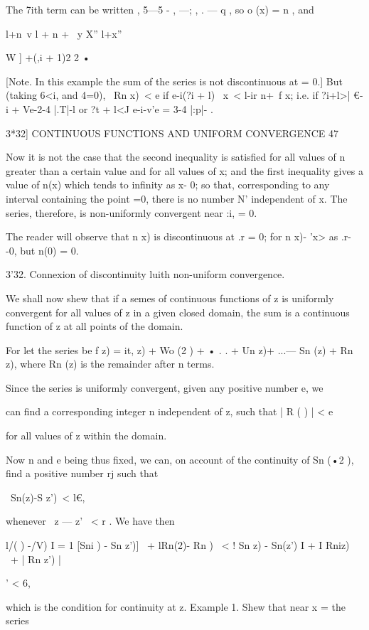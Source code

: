 The 7ith term can be written , 5—5 - , —; , . — q , so o (x) = n ,
and

l+n\ v l + n + \ y X'' l+x''

  W ] +(,i + 1)2 2 •

[Note. In this example the sum of the series is not discontinuous at =
0.] But (taking 6<i, and 4=0), \ Rn x)\ < e if e-i(?i + l) \ x\ < l-ir
n+\ f x; i.e. if ?i+l>| €-i + Ve-2-4 |.T|-l or ?t + l<J e-i-v'e = 3-4
|:p|- .



3*32] CONTINUOUS FUNCTIONS AND UNIFORM CONVERGENCE 47

Now it is not the case that the second inequality is satisfied for all
values of n greater than a certain value and for all values of x; and
the first inequality gives a value of n(x) which tends to infinity as
x- 0; so that, corresponding to any interval containing the point =0,
there is no number N' independent of x. The series, therefore, is
non-uniformly convergent near :i, = 0.

The reader will observe that n x) is discontinuous at .r = 0; for n
x)- 'x> as .r- -0, but n(0) = 0.

3'32. Connexion of discontinuity luith non-uniform convergence.

We shall now shew that if a semes of continuous functions of z is
uniformly convergent for all values of z in a given closed domain, the
sum is a continuous function of z at all points of the domain.

For let the series be f z) = it, z) + Wo (2 ) + • . . + Un z)+ ...— Sn
(z) + Rn z), where Rn (z) is the remainder after n terms.

Since the series is uniformly convergent, given any positive number e,
we

can find a corresponding integer n independent of z, such that | R ( )
| < e

for all values of z within the domain.

Now n and e being thus fixed, we can, on account of the continuity of
Sn (•2 ), find a positive number rj such that

\ Sn(z)-S z')\ < l€,

whenever \ z — z' \ < r . We have then

l/( ) -/V) I = 1 [Sni ) - Sn z')] \ + lRn(2)- Rn ) \ < ! Sn z) -
Sn(z') I + I Rniz) \ + | Rn z') |

' < 6,

which is the condition for continuity at z. Example 1. Shew that near
x = the series

